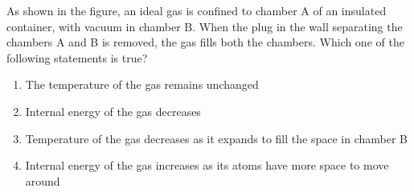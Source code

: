 \item As shown in the figure, an ideal gas is confined to chamber A of an insulated container, with vacuum in chamber B. When the plug in the wall separating the chambers A and B is removed, the gas fills both the chambers. Which one of the following statements is true?


\begin{enumerate}
\item The temperature of the gas remains unchanged
\item Internal energy of the gas decreases
\item Temperature of the gas decreases as it expands to fill the space in chamber B
\item Internal energy of the gas increases as its atoms have more space to move around
\end{enumerate}
